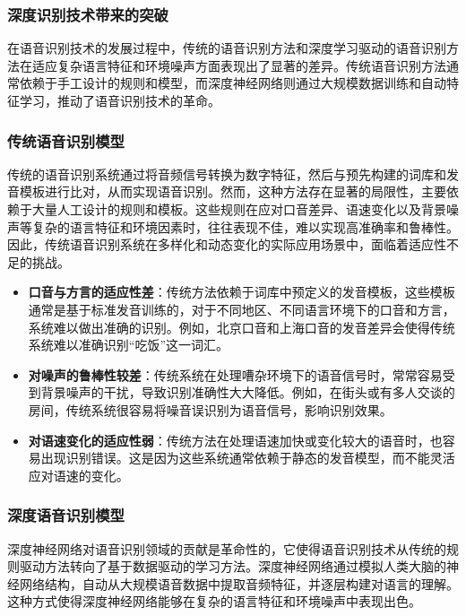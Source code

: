 \subsubsection{深度识别技术带来的突破}


在语音识别技术的发展过程中，传统的语音识别方法和深度学习驱动的语音识别方法在适应复杂语言特征和环境噪声方面表现出了显著的差异。传统语音识别方法通常依赖于手工设计的规则和模型，而深度神经网络则通过大规模数据训练和自动特征学习，推动了语音识别技术的革命。

\subsubsection{传统语音识别模型}

传统的语音识别系统通过将音频信号转换为数字特征，然后与预先构建的词库和发音模板进行比对，从而实现语音识别。然而，这种方法存在显著的局限性，主要依赖于大量人工设计的规则和模板。这些规则在应对口音差异、语速变化以及背景噪声等复杂的语言特征和环境因素时，往往表现不佳，难以实现高准确率和鲁棒性。因此，传统语音识别系统在多样化和动态变化的实际应用场景中，面临着适应性不足的挑战。

\begin{itemize}
    \item \textbf{口音与方言的适应性差}：传统方法依赖于词库中预定义的发音模板，这些模板通常是基于标准发音训练的，对于不同地区、不同语言环境下的口音和方言，系统难以做出准确的识别。例如，北京口音和上海口音的发音差异会使得传统系统难以准确识别“吃饭”这一词汇。
    \item \textbf{对噪声的鲁棒性较差}：传统系统在处理嘈杂环境下的语音信号时，常常容易受到背景噪声的干扰，导致识别准确性大大降低。例如，在街头或有多人交谈的房间，传统系统很容易将噪音误识别为语音信号，影响识别效果。
    \item \textbf{对语速变化的适应性弱}：传统方法在处理语速加快或变化较大的语音时，也容易出现识别错误。这是因为这些系统通常依赖于静态的发音模型，而不能灵活应对语速的变化。
\end{itemize}

\subsubsection{深度语音识别模型}

深度神经网络对语音识别领域的贡献是革命性的，它使得语音识别技术从传统的规则驱动方法转向了基于数据驱动的学习方法。深度神经网络通过模拟人类大脑的神经网络结构，自动从大规模语音数据中提取音频特征，并逐层构建对语言的理解。这种方式使得深度神经网络能够在复杂的语言特征和环境噪声中表现出色。

